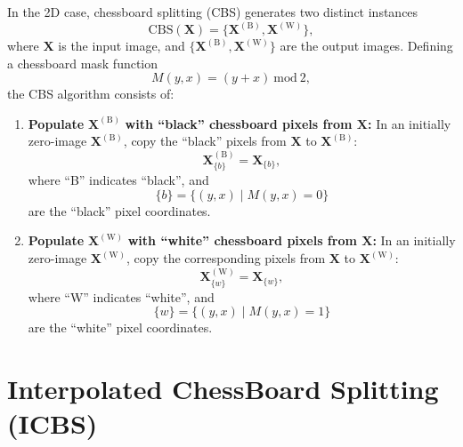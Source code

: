 \documentclass{article}
\begin{document}
In the 2D case, chessboard splitting (CBS) generates two distinct
instances
\begin{equation}
  \mathrm{CBS}(\mathbf{X})=\{\mathbf{X}^{(\text{B})},\mathbf{X}^{(\text{W})}\},
\end{equation}
where $\mathbf{X}$ is the input image, and
$\{\mathbf{X}^{(\text{B})},\mathbf{X}^{(\text{W})}\}$ are the output
images. Defining a chessboard mask function
\begin{equation}
  M(y,x)=(y+x)~\text{mod}~2,
\end{equation}
the CBS algorithm consists of:
\begin{enumerate}
\item \textbf{Populate} $\mathbf{X}^{(\text{B})}$ \textbf{with
    ``black'' chessboard pixels from $\mathbf{X}$:} In an initially
  zero-image $\mathbf{X}^{(\text{B})}$, copy the ``black'' pixels from
  $\mathbf{X}$ to $\mathbf{X}^{(\text{B})}$:
  \begin{equation}
    \mathbf{X}^{(\text{B})}_{\{b\}} = \mathbf{X}_{\{b\}},
    \label{eq:copy_blacks}
  \end{equation}
  where ``B'' indicates ``black'', and
  \begin{equation}
    \{b\} = \{(y, x) \mid M(y, x)=0\}
    \label{eq:black_pixels}
  \end{equation}
  are the ``black'' pixel coordinates.
  
\item \textbf{Populate} $\mathbf{X}^{(\text{W})}$ \textbf{with
    ``white'' chessboard pixels from $\mathbf{X}$:} In an initially
  zero-image $\mathbf{X}^{(\text{W})}$, copy the corresponding pixels
  from $\mathbf{X}$ to $\mathbf{X}^{(\text{W})}$:
  \begin{equation}
    \mathbf{X}^{(\text{W})}_{\{w\}} = \mathbf{X}_{\{w\}},
    \label{eq:copy_whites}
  \end{equation}
  where ``W'' indicates ``white'', and
  \begin{equation}
    \{w\} = \{(y, x) \mid M(y, x)=1\}
    \label{eq:white_pixels}
  \end{equation}
  are the ``white'' pixel coordinates.
  
\end{enumerate}


\section{Interpolated ChessBoard Splitting (ICBS)}
\label{ape:ICBS}
\end{document}
